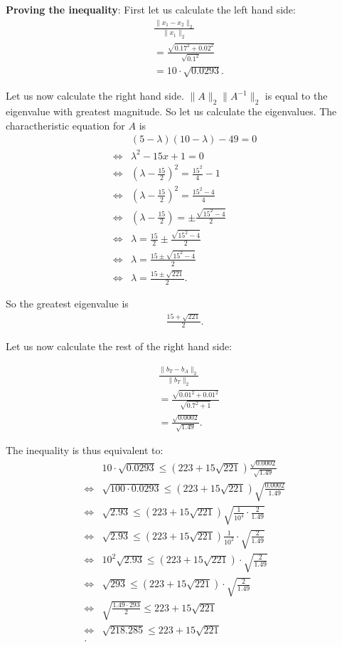 \documentclass[10pt]{article}
\begin{document}
\begin{solution}[4]
\textbf{Proving the inequality}:
First let us calculate the left hand side:
\begin{align*}
 &  \frac{\| x_1 - x_2 \| _{2}}{\| x_1 \| _{2}} \\
& = \frac{\sqrt{0.17 ^2 + 0.02 ^2}}{\sqrt{0.1 ^2}} \\
& = 10 \cdot \sqrt{0.0293}
.
\end{align*}


Let us now calculate the right hand side.
\(\| A \| _{2} \| A^{-1}  \| _{2}\) is equal to the eigenvalue with greatest magnitude. So let us
calculate the eigenvalues.
The charactheristic equation for \(A\) is
\begin{align*}
 &  (5- \lambda) (10 - \lambda) - 49 = 0 \\
\iff & \lambda ^2 - 15x + 1 = 0 \\
\iff & (\lambda - \frac{15}{2}) ^2  = \frac{15 ^2}{4}  -1 \\
\iff & (\lambda - \frac{15}{2}) ^2  = \frac{15 ^2 - 4}{4} \\
\iff & (\lambda - \frac{15}{2})  = \pm \frac{\sqrt{15 ^2 - 4}}{2} \\
\iff & \lambda  = \frac{15}{2} \pm \frac{\sqrt{15 ^2 - 4}}{2} \\
\iff & \lambda  =  \frac{15 \pm \sqrt{15 ^2 - 4}}{2} \\
\iff & \lambda  =  \frac{15 \pm \sqrt{221}}{2}
.
\end{align*}

So the greatest eigenvalue is
\begin{align*}
\frac{15 + \sqrt{221}}{2} 
.
\end{align*}


Let us now calculate the rest of the right hand side:

\begin{align*}
 &  \frac{\| b_T - b_A \| _{2}}{\| b_T \| _{2}} \\
& = \frac{\sqrt{0.01 ^2 + 0.01 ^2}}{\sqrt{0.7 ^2 + 1}} \\
& = \frac{\sqrt{0.0002}}{\sqrt{1.49}} 
.
\end{align*}

The inequality is thus equivalent to:
\begin{align*}
 &  10 \cdot \sqrt{0.0293} \leq (223 + 15 \sqrt{221})\frac{\sqrt{0.0002}}{\sqrt{1.49}} \\
\iff & \sqrt{100 \cdot 0.0293} \leq (223 + 15 \sqrt{221}) \sqrt{\frac{0.0002}{1.49} } \\
\iff & \sqrt{2.93} \leq (223 + 15 \sqrt{221}) \sqrt{\frac{1}{10^{4}} \cdot \frac{2}{1.49}} \\
\iff & \sqrt{2.93} \leq (223 + 15 \sqrt{221}) \frac{1}{10 ^2} \cdot \sqrt{\frac{2}{1.49}} \\
\iff & 10 ^2 \sqrt{2.93} \leq (223 + 15 \sqrt{221}) \cdot \sqrt{\frac{2}{1.49}} \\
\iff &  \sqrt{293} \leq (223 + 15 \sqrt{221}) \cdot \sqrt{\frac{2}{1.49}} \\
\iff &  \sqrt{\frac{1.49 \cdot293}{2}} \leq 223 + 15 \sqrt{221} \\
\iff &  \sqrt{218.285} \leq 223 + 15 \sqrt{221} \\
.
\end{align*}


\end{solution}
\end{document}
